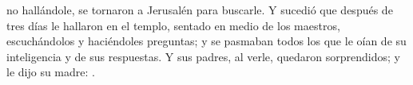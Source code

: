  no hallándole, se tornaron a Jerusalén para buscarle. Y sucedió que después de tres días le hallaron en el templo,
sentado en medio de los maestros, escuchándolos y haciéndoles preguntas; y se pasmaban todos los que le oían de su inteligencia y de sus respuestas.
Y sus padres, al verle, quedaron sorprendidos; y le dijo su madre: .